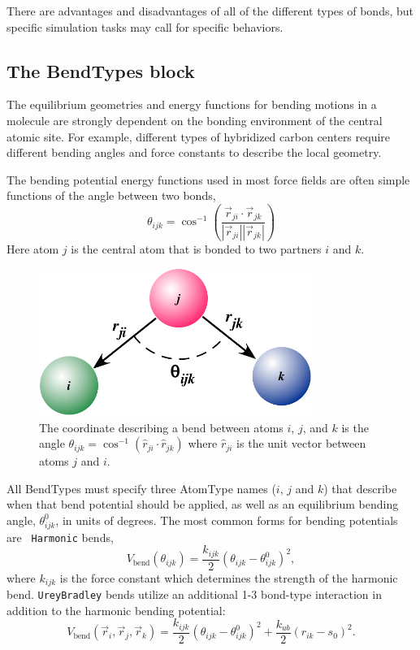 \documentclass[]{book}
\begin{document}
There are advantages and disadvantages of all of the different types
of bonds, but specific simulation tasks may call for specific
behaviors.

\subsection{\label{section:ffBend}The BendTypes block}
The equilibrium geometries and energy functions for bending motions in
a molecule are strongly dependent on the bonding environment of the
central atomic site.  For example, different types of hybridized
carbon centers require different bending angles and force constants to
describe the local geometry.

The bending potential energy functions used in most force fields are
often simple functions of the angle between two bonds,
\begin{equation}
\theta_{ijk} = \cos^{-1} \left(\frac{\vec{r}_{ji} \cdot
    \vec{r}_{jk}}{\left| \vec{r}_{ji} \right| \left| \vec{r}_{jk}
    \right|} \right)
\end{equation} 
Here atom $j$ is the central atom that is bonded to two partners $i$
and $k$.

\begin{figure}[h]
\centering
\includegraphics[width=3.5in]{bend.pdf}
\caption[Bend angle coordinates]{The coordinate describing a bend
  between atoms $i$, $j$, and $k$ is the angle $\theta_{ijk} =
  \cos^{-1} \left(\hat{r}_{ji} \cdot \hat{r}_{jk}\right)$ where $\hat{r}_{ji}$ is
  the unit vector between atoms $j$ and $i$. }
\label{fig:bend}
\end{figure}


All BendTypes must specify three AtomType names ($i$, $j$ and $k$)
that describe when that bend potential should be applied, as well as
an equilibrium bending angle, $\theta_{ijk}^0$, in units of
degrees. The most common forms for bending potentials are {\tt
  Harmonic} bends,
\begin{equation}
V_{\text{bend}}(\theta_{ijk}) = \frac{k_{ijk}}{2}( \theta_{ijk} - \theta_{ijk}^0
)^2, \label{eq:bendPot}
\end{equation}
where $k_{ijk}$ is the force constant which determines the strength of
the harmonic bend. {\tt UreyBradley} bends utilize an additional 1-3
bond-type interaction in addition to the harmonic bending potential:
\begin{equation}
  V_{\text{bend}}(\vec{r}_i , \vec{r}_j, \vec{r}_k)
  =\frac{k_{ijk}}{2}( \theta_{ijk} - \theta_{ijk}^0)^2 
  + \frac{k_{ub}}{2}( r_{ik} - s_0 )^2. \label{eq:ubBend}
\end{equation}
\end{document}
